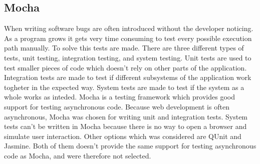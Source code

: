 \subsection{Mocha}
When writing software bugs are often introduced without the developer noticing. As a program grows it gets very time consuming to test every possible execution path manually. To solve this tests are made. There are three different types of tests, unit testing, integration testing, and system testing. Unit tests are used to test smaller pieces of code which doesn't rely on other parts of the application. Integration tests are made to test if different subsystems of the application work togheter in the expected way. System tests are made to test if the system as a whole works as inteded. Mocha is a testing framework which provides good support for testing asynchronous code. Because web development is often asynchronous, Mocha was chosen for writing unit and integration tests. System tests can't be written in Mocha because there is no way to open a browser and simulate user interaction. Other options which was considered are QUnit and Jasmine. Both of them doesn't provide the same support for testing asynchronous code as Mocha, and were therefore not selected.